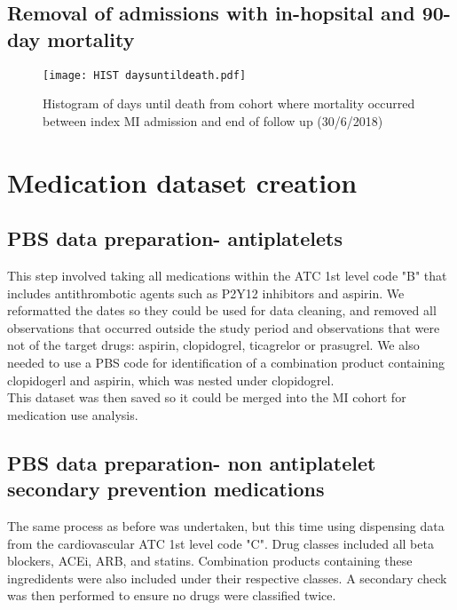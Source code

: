 \documentclass[11pt]{article}
\begin{document}
\subsection{Removal of admissions with in-hopsital and 90-day mortality}
\color{violet}
\begin{stlog}\end{stlog}
\color{black}
\begin{figure} [h]
	\centering
	\texttt{[image: HIST daysuntildeath.pdf]}
	\caption{Histogram of days until death from cohort where mortality occurred between index MI admission and end of follow up (30/6/2018)}
	\label{daysuntildeath}
\end{figure}

\section{Medication dataset creation}
\subsection{PBS data preparation- antiplatelets}
This step involved taking all medications within the ATC 1st level code "B" that includes antithrombotic agents such as P2Y12 inhibitors and aspirin. We reformatted the dates so they could be used for data cleaning, and removed all observations that occurred outside the study period and observations that were not of the target drugs: aspirin, clopidogrel, ticagrelor or prasugrel. We also needed to use a PBS code for identification of a combination product containing clopidogerl and aspirin, which was nested under clopidogrel.\\
This dataset was then saved so it could be merged into the MI cohort for medication use analysis. 
\color{violet}
\begin{stlog}\end{stlog}
\color{black}
\subsection{PBS data preparation- non antiplatelet secondary prevention medications}
The same process as before was undertaken, but this time using dispensing data from the cardiovascular ATC 1st level code "C". Drug classes included all beta blockers, ACEi, ARB, and statins. Combination products containing these ingredidents were also included under their respective classes. A secondary check was then performed to ensure no drugs were classified twice.
\color{violet}
\begin{stlog}\end{stlog}
\color{black}
\end{document}
